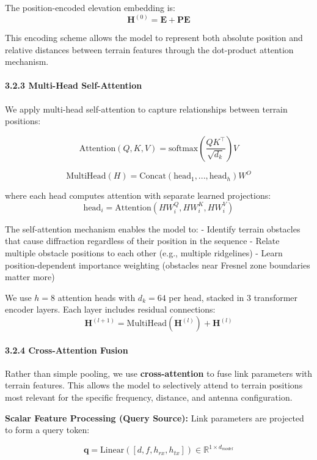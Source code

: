 \documentclass[
]{article}
\begin{document}
The position-encoded elevation embedding is:
\[\mathbf{H}^{(0)} = \mathbf{E} + \mathbf{PE}\]

This encoding scheme allows the model to represent both absolute
position and relative distances between terrain features through the
dot-product attention mechanism.

\paragraph{3.2.3 Multi-Head
Self-Attention}\label{multi-head-self-attention}

We apply multi-head self-attention to capture relationships between
terrain positions:

\[\text{Attention}(Q, K, V) = \text{softmax}\left(\frac{QK^\top}{\sqrt{d_k}}\right)V\]

\[\text{MultiHead}(H) = \text{Concat}(\text{head}_1, ..., \text{head}_h)W^O\]

where each head computes attention with separate learned projections:
\[\text{head}_i = \text{Attention}(HW_i^Q, HW_i^K, HW_i^V)\]

The self-attention mechanism enables the model to: - Identify terrain
obstacles that cause diffraction regardless of their position in the
sequence - Relate multiple obstacle positions to each other (e.g.,
multiple ridgelines) - Learn position-dependent importance weighting
(obstacles near Fresnel zone boundaries matter more)

We use \(h=8\) attention heads with \(d_k = 64\) per head, stacked in 3
transformer encoder layers. Each layer includes residual connections:
\[\mathbf{H}^{(l+1)} = \text{MultiHead}(\mathbf{H}^{(l)}) + \mathbf{H}^{(l)}\]

\paragraph{3.2.4 Cross-Attention Fusion}\label{cross-attention-fusion}

Rather than simple pooling, we use \textbf{cross-attention} to fuse link
parameters with terrain features. This allows the model to selectively
attend to terrain positions most relevant for the specific frequency,
distance, and antenna configuration.

\textbf{Scalar Feature Processing (Query Source):} Link parameters are
projected to form a query token:

\[\mathbf{q} = \text{Linear}([d, f, h_{rx}, h_{tx}]) \in \mathbb{R}^{1 \times d_{model}}\]
\end{document}

